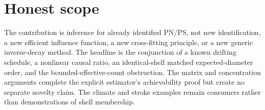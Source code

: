 \documentclass{article}
\begin{document}
\section{Honest scope}

The contribution is inference for already identified PN/PS, not new identification, a new efficient influence function, a new cross-fitting principle, or a new generic inverse-decay method. The headline is the conjunction of a known drifting schedule, a nonlinear causal ratio, an identical-shell matched expected-diameter order, and the bounded-effective-count obstruction. The matrix and concentration arguments complete the explicit estimator's achievability proof but create no separate novelty claim. The climate and stroke examples remain consumers rather than demonstrations of shell membership.
\end{document}
